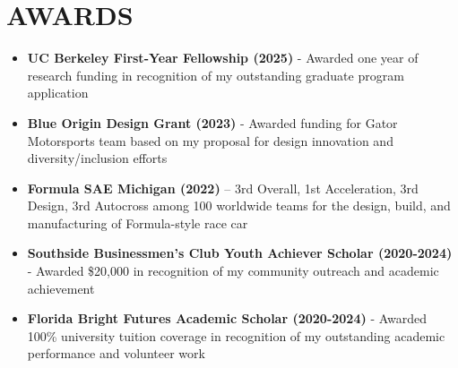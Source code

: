 \documentclass[10pt]{article}
\begin{document}
\section*{AWARDS}
\begin{itemize}[left=0em, itemsep=0.3em]
    \item \textbf{UC Berkeley First-Year Fellowship (2025)} - Awarded one year of research funding in recognition of my outstanding graduate program application
    \item \textbf{Blue Origin Design Grant (2023)} - Awarded funding for Gator Motorsports team based on my proposal for design innovation and diversity/inclusion efforts
    \item \textbf{Formula SAE Michigan (2022)} – 3rd Overall, 1st Acceleration, 3rd Design, 3rd Autocross among 100 worldwide teams for the design, build, and manufacturing of Formula-style race car
    \item \textbf{Southside Businessmen’s Club Youth Achiever Scholar (2020-2024)} - Awarded \$20,000 in recognition of my community outreach and academic achievement
    \item \textbf{Florida Bright Futures Academic Scholar (2020-2024)} - Awarded 100\% university tuition coverage in recognition of my outstanding academic performance and volunteer work 
\end{itemize}
 
\end{document}
